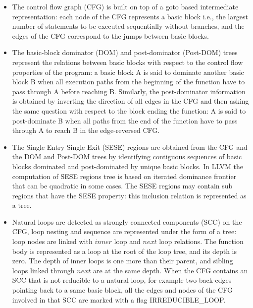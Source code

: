 \documentclass{sig-alternate}
\begin{document}
\begin{itemize}
\item The control flow graph (CFG) \cite{dragonbook} is built on top of a goto
  based intermediate representation: each node of the CFG represents a basic
  block i.e., the largest number of statements to be executed sequentially
  without branches, and the edges of the CFG correspond to the jumps between
  basic blocks.

\item The basic-block dominator (DOM) and post-dominator (Post-DOM) trees
  \cite{dragonbook, ramalingam} represent the relations between basic blocks with
  respect to the control flow properties of the program: a basic block A is said
  to dominate another basic block B when all execution paths from the beginning
  of the function have to pass through A before reaching B.  Similarly, the
  post-dominator information is obtained by inverting the direction of all edges
  in the CFG and then asking the same question with respect to the block ending
  the function: A is said to post-dominate B when all paths from the end of the
  function have to pass through A to reach B in the edge-reversed CFG.

\item The Single Entry Single Exit (SESE) regions \cite{sese} are obtained from
  the CFG and the DOM and Post-DOM trees by identifying contiguous sequences of
  basic blocks dominated and post-dominated by unique basic blocks.  In LLVM the
  computation of SESE regions tree is based on iterated dominance frontier
  \cite{ramalingam} that can be quadratic in some cases.  The SESE regions may
  contain sub regions that have the SESE property: this inclusion relation is
  represented as a tree.

\label{subsec:loop-tree}
\item Natural loops \cite{dragonbook, ramalingam} are detected as strongly connected
  components (SCC) \cite{tarjan} on the CFG, loop nesting and sequence are
  represented under the form of a tree: loop nodes are linked with $inner$ loop
  and $next$ loop relations.  The function body is represented as a loop at the
  root of the loop tree, and its depth is zero.  The depth of inner loops is one
  more than their parent, and sibling loops linked through $next$ are at the
  same depth.  When the CFG contains an SCC that is not reducible to a natural
  loop, for example two back-edges pointing back to a same basic block, all the
  edges and nodes of the CFG involved in that SCC are marked with a flag
  IRREDUCIBLE\_LOOP.


\end{itemize}
\end{document}
